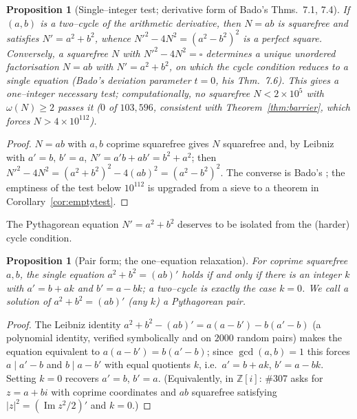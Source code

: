 \documentclass[11pt]{article}
\newtheorem{proposition}[theorem]{Proposition}
\theoremstyle{definition}
\begin{document}
\begin{proposition}[Single--integer test; derivative form of Bado's Thms.~7.1, 7.4]\label{prop:pyth}
If $(a,b)$ is a two--cycle of the arithmetic derivative, then $N=ab$ is squarefree and satisfies
$N'=a^2+b^2$, whence $N'^2-4N^2=(a^2-b^2)^2$ is a perfect square. Conversely, a squarefree $N$ with
$N'^2-4N^2=\square$ determines a unique unordered factorisation $N=ab$ with $N'=a^2+b^2$, on which the
cycle condition reduces to a single equation (Bado's deviation parameter $t=0$, his Thm.~7.6). This
gives a one--integer necessary test;
computationally, no squarefree $N<2\times10^5$ with $\omega(N)\ge2$ passes it ($0$ of $103{,}596$,
consistent with Theorem~\ref{thm:barrier}, which forces $N>4\times10^{112}$).
\end{proposition}
\begin{proof}
$N=ab$ with $a,b$ coprime squarefree gives $N$ squarefree and, by Leibniz with $a'=b,\,b'=a$,
$N'=a'b+ab'=b^2+a^2$; then $N'^2-4N^2=(a^2+b^2)^2-4(ab)^2=(a^2-b^2)^2$. The converse is Bado's
\cite{Bado2026}; the emptiness of the test below $10^{112}$ is upgraded from a sieve to a theorem in
Corollary~\ref{cor:emptytest}.
\end{proof}

The Pythagorean equation $N'=a^2+b^2$ deserves to be isolated from the (harder) cycle condition.

\begin{proposition}[Pair form; the one--equation relaxation]\label{prop:pairform}
For coprime squarefree $a,b$, the single equation $a^2+b^2=(ab)'$ holds if and only if there is an
integer $k$ with $a'=b+ak$ and $b'=a-bk$; a two--cycle is exactly the case $k=0$. We call a solution
of $a^2+b^2=(ab)'$ (any $k$) a \emph{Pythagorean pair}.
\end{proposition}
\begin{proof}
The Leibniz identity $a^2+b^2-(ab)'=a(a-b')-b(a'-b)$ (a polynomial identity, verified symbolically
and on $2000$ random pairs) makes the equation equivalent to $a(a-b')=b(a'-b)$; since $\gcd(a,b)=1$
this forces $a\mid a'-b$ and $b\mid a-b'$ with equal quotients $k$, i.e.\ $a'=b+ak$, $b'=a-bk$.
Setting $k=0$ recovers $a'=b$, $b'=a$. (Equivalently, in $\mathbb{Z}[i]$: \#307 asks for $z=a+bi$ with
coprime coordinates and $ab$ squarefree satisfying $|z|^2=(\operatorname{Im}z^2/2)'$ and $k=0$.)
\end{proof}
\end{document}
